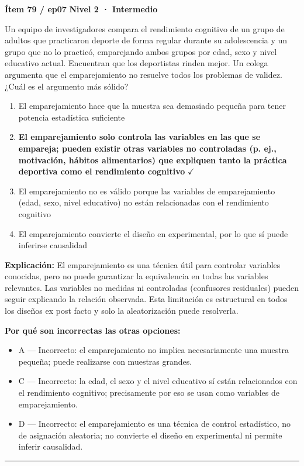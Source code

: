 \documentclass[12pt,a4paper]{article}
\begin{document}
\begin{mdframed}[backgroundcolor=fondogris,linecolor=ambar,linewidth=1pt,innerleftmargin=10pt,innerrightmargin=10pt,innertopmargin=7pt,innerbottommargin=7pt]
\textbf{Ítem 79 / ep07} \hfill {\small\bfseries\color{ambar} Nivel 2 · Intermedio}
\end{mdframed}

Un equipo de investigadores compara el rendimiento cognitivo de un grupo de adultos que practicaron deporte de forma regular durante su adolescencia y un grupo que no lo practicó, emparejando ambos grupos por edad, sexo y nivel educativo actual. Encuentran que los deportistas rinden mejor. Un colega argumenta que el emparejamiento no resuelve todos los problemas de validez. ¿Cuál es el argumento más sólido?

\begin{enumerate}
  \item[A.] El emparejamiento hace que la muestra sea demasiado pequeña para tener potencia estadística suficiente
  \item[\textbf{\color{verde}B.}] \textbf{\color{verde} El emparejamiento solo controla las variables en las que se empareja; pueden existir otras variables no controladas (p. ej., motivación, hábitos alimentarios) que expliquen tanto la práctica deportiva como el rendimiento cognitivo} \hfill $\checkmark$
  \item[C.] El emparejamiento no es válido porque las variables de emparejamiento (edad, sexo, nivel educativo) no están relacionadas con el rendimiento cognitivo
  \item[D.] El emparejamiento convierte el diseño en experimental, por lo que sí puede inferirse causalidad
\end{enumerate}

\noindent\textbf{\color{azul}Explicación:} El emparejamiento es una técnica útil para controlar variables conocidas, pero no puede garantizar la equivalencia en todas las variables relevantes. Las variables no medidas ni controladas (confusores residuales) pueden seguir explicando la relación observada. Esta limitación es estructural en todos los diseños ex post facto y solo la aleatorización puede resolverla.

\noindent\textbf{\color{gris}Por qué son incorrectas las otras opciones:}
\begin{itemize}
  \item {\small A — Incorrecto: el emparejamiento no implica necesariamente una muestra pequeña; puede realizarse con muestras grandes.}
  \item {\small C — Incorrecto: la edad, el sexo y el nivel educativo sí están relacionados con el rendimiento cognitivo; precisamente por eso se usan como variables de emparejamiento.}
  \item {\small D — Incorrecto: el emparejamiento es una técnica de control estadístico, no de asignación aleatoria; no convierte el diseño en experimental ni permite inferir causalidad.}
\end{itemize}
\vspace{8pt}\hrule\vspace{10pt}
\end{document}
